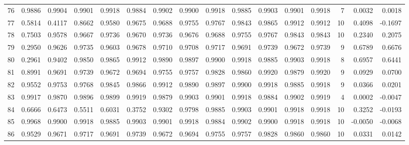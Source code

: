 \begin{tabular}{lrrrrrrrrrrrrrrr}
76  &      0.9886 &  0.9904 &  0.9901 &  0.9918 &  0.9884 &  0.9902 &  0.9900 &  0.9918 &  0.9885 &  0.9903 &   0.9901 &     0.9918 &      7 &                    0.0032 &                     0.0018 \\
77  &      0.5814 &  0.4117 &  0.8662 &  0.9580 &  0.9675 &  0.9688 &  0.9755 &  0.9767 &  0.9843 &  0.9865 &   0.9912 &     0.9912 &     10 &                    0.4098 &                    -0.1697 \\
78  &      0.7503 &  0.9578 &  0.9667 &  0.9736 &  0.9670 &  0.9736 &  0.9676 &  0.9688 &  0.9755 &  0.9767 &   0.9843 &     0.9843 &     10 &                    0.2340 &                     0.2075 \\
79  &      0.2950 &  0.9626 &  0.9735 &  0.9603 &  0.9678 &  0.9710 &  0.9708 &  0.9717 &  0.9691 &  0.9739 &   0.9672 &     0.9739 &      9 &                    0.6789 &                     0.6676 \\
80  &      0.2961 &  0.9402 &  0.9850 &  0.9865 &  0.9912 &  0.9890 &  0.9897 &  0.9900 &  0.9918 &  0.9885 &   0.9903 &     0.9918 &      8 &                    0.6957 &                     0.6441 \\
81  &      0.8991 &  0.9691 &  0.9739 &  0.9672 &  0.9694 &  0.9755 &  0.9757 &  0.9828 &  0.9860 &  0.9920 &   0.9879 &     0.9920 &      9 &                    0.0929 &                     0.0700 \\
82  &      0.9552 &  0.9753 &  0.9768 &  0.9845 &  0.9866 &  0.9912 &  0.9890 &  0.9897 &  0.9900 &  0.9918 &   0.9885 &     0.9918 &      9 &                    0.0366 &                     0.0201 \\
83  &      0.9917 &  0.9870 &  0.9896 &  0.9899 &  0.9919 &  0.9879 &  0.9903 &  0.9901 &  0.9918 &  0.9884 &   0.9902 &     0.9919 &      4 &                    0.0002 &                    -0.0047 \\
84  &      0.6666 &  0.6473 &  0.5511 &  0.6031 &  0.3752 &  0.9302 &  0.9798 &  0.9885 &  0.9903 &  0.9901 &   0.9918 &     0.9918 &     10 &                    0.3252 &                    -0.0193 \\
85  &      0.9968 &  0.9900 &  0.9918 &  0.9885 &  0.9903 &  0.9901 &  0.9918 &  0.9884 &  0.9902 &  0.9900 &   0.9918 &     0.9918 &     10 &                   -0.0050 &                    -0.0068 \\
86  &      0.9529 &  0.9671 &  0.9717 &  0.9691 &  0.9739 &  0.9672 &  0.9694 &  0.9755 &  0.9757 &  0.9828 &   0.9860 &     0.9860 &     10 &                    0.0331 &                     0.0142 \\

\end{tabular}
